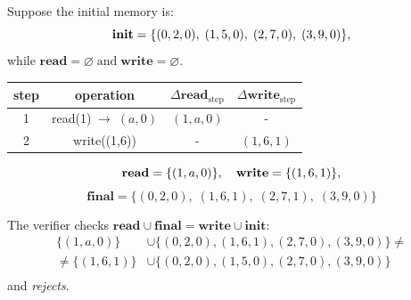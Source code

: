 \documentclass{zkdl-presentation-template}
\begin{document}
    \begin{frame}
        \begin{example}
            Suppose the initial memory is:
            \vspace{-5px}
            \begin{equation*}
                \mathbf{init} =\{(0,2,0), \; (1,5,0), \; (2,7,0), \; (3,9,0)\},
                \vspace{-5px}
            \end{equation*}
            while $\mathbf{read} = \varnothing \; \text{and} \; \mathbf{write} = \varnothing$.

            
            \vspace{6px}
            \begin{center}
                \begin{tabular}{c|c|c|c}
                \textbf{step} & \textbf{operation} & $\Delta\mathbf{read}_{\text{step}}$ & $\Delta\mathbf{write}_{\text{step}}$\\\hline
                1 & read(1)$  \; \to \; (a, 0)$ & $(1,a,0)$ & -        \\
                2 & write((1,6))                & -         & $(1,6,1)$\\
                \end{tabular}
            \end{center}
            
            \vspace{5px}
            \begin{equation*}
                \mathbf{read} = \{(1,a,0)\},\quad
                \mathbf{write} = \{(1,6,1)\},
                \vspace{-5px}
            \end{equation*}
            \begin{equation*}
                \mathbf{final} = \{(0,2,0), \; (1,6,1), \; (2,7,1), \; (3,9,0)\}
            \end{equation*}
            
            The verifier checks $\mathbf{read} \cup \mathbf{final} = \mathbf{write} \cup \mathbf{init}$:
            \vspace{-5px}
            \begin{align*}
                \{(1,a,0)\} &\cup \{(0,2,0), (1,6,1), (2,7,0), (3,9,0)\} \neq \\
                \neq \{(1,6,1)\} &\cup \{(0,2,0), (1,5,0), (2,7,0), (3,9,0)\} \\[-20px]
            \end{align*}
            and \emph{rejects}.
        \end{example}
    \end{frame}
\end{document}
